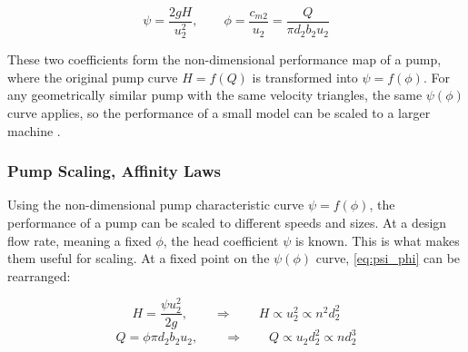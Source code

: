 \begin{equation}
    \psi = \frac{2gH}{u_2^2}, \qquad
    \phi = \frac{c_{m2}}{u_2} = \frac{Q}{\pi d_2 b_2 u_2}
    \label{eq:psi_phi}
\end{equation}

These two coefficients form the non-dimensional performance map of a pump, where the original pump curve $H=f(Q)$ is transformed into $\psi = f(\phi)$. For any geometrically similar pump with the same velocity triangles, the same $\psi(\phi)$ curve applies, so the performance of a small model can be scaled to a larger machine \cite{gulichCentrifugalPumps2020}.

\subsubsection{Pump Scaling, Affinity Laws}
\label{sec:theory_scaling}

Using the non-dimensional pump characteristic curve $\psi=f(\phi)$, the performance of a pump can be scaled to different speeds and sizes. At a design flow rate, meaning a fixed $\phi$, the head coefficient $\psi$ is known. This is what makes them useful for scaling. At a fixed point on the $\psi(\phi)$ curve, \cref{eq:psi_phi} can be rearranged:

\begin{equation}
    H = \frac{\psi u_2^2}{2g}, \qquad \Rightarrow \qquad H \propto u_2^2 \propto n^2 d_2^2
    \label{eq:head_scaling}
\end{equation}
\begin{equation}
    Q = \phi \pi d_2 b_2 u_2, \qquad \Rightarrow \qquad Q \propto u_2 d_2^2 \propto n d_2^3
    \label{eq:flow_scaling}
\end{equation}

